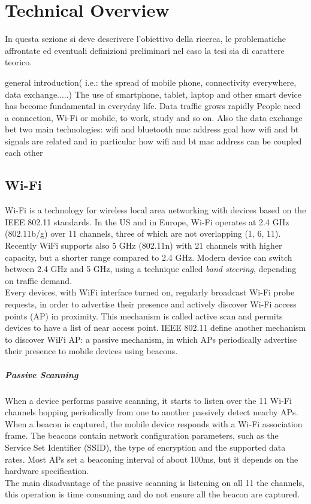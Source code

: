 \chapter{Technical Overview}
\label{chapter 3}
\thispagestyle{empty}


\noindent In questa sezione si deve descrivere l'obiettivo della ricerca, le problematiche affrontate ed eventuali definizioni preliminari nel caso la tesi sia di carattere teorico.

general introduction( i.e.: the spread of mobile phone, connectivity everywhere, data exchange.....)
The use of smartphone, tablet, laptop and other smart device has become fundamental in everyday life. Data traffic grows rapidly People need a connection, Wi-Fi or mobile, to work, study and so on. Also the data exchange bet
two main technologies: wifi and bluetooth
mac address
goal
how wifi and bt signals are related and in particular how wifi and bt mac address can be coupled each other

\section{Wi-Fi}
Wi-Fi is a technology for wireless local area networking with devices based on the IEEE 802.11 standards. In the US and in Europe, Wi-Fi operates at 2.4 GHz (802.11b/g) over 11 channels, three of which are not overlapping (1, 6, 11). Recently WiFi supports also 5 GHz (802.11n) with 21 channels with higher capacity, but a shorter range compared to 2.4 GHz. Modern device can switch between 2.4 GHz and 5 GHz, using a technique called \textit{band steering}, depending on traffic demand.\\
\linebreak
Every devices, with WiFi interface turned on, regularly broadcast Wi-Fi probe requests, in order to advertise their presence and actively discover Wi-Fi access points (AP) in proximity. This mechanism is called active scan and permits devices to have a list of near access point. IEEE 802.11 define another mechanism to discover WiFi AP: a passive mechanism, in which APs periodically advertise their presence to mobile devices using beacons.
\paragraph{Passive Scanning}
When a device performs passive scanning, it starts to listen over the 11 Wi-Fi channels hopping periodically from one to another passively detect nearby APs. When a beacon is captured, the mobile device responds with a Wi-Fi association frame. The beacons contain network configuration parameters, such as the Service Set Identifier (SSID), the type of encryption and the supported data rates. Most APs set a beaconing interval of about 100ms, but it depends on the hardware specification.\\
The main disadvantage of the passive scanning is listening on all 11 the channels, this operation is time consuming and do not ensure all the beacon are captured.
